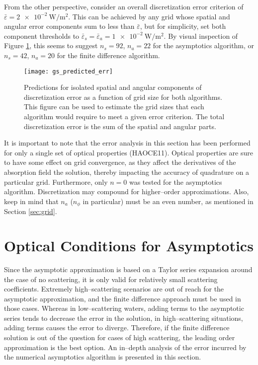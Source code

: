 From the other perspective, consider an overall discretization error criterion of $\bar{\varepsilon}=\SI{2e-2}{\W\per\m\squared}$.
This can be achieved by any grid whose spatial and angular error components sum to less than $\bar{\varepsilon}$, but for simplicity, set both component thresholds to $\bar{\varepsilon}_s=\bar{\varepsilon}_a=\SI{1e-2}{\W\per\m\squared}$.
By visual inspection of Figure \ref{fig:gs_predicted_err}, this seems to suggest $n_s=92$, $n_a=22$ for the asymptotics algorithm, or $n_s=42$, $n_a=20$ for the finite difference algorithm.

\begin{figure}[H]
  \centering
  \texttt{[image: gs\_predicted\_err]}
  \caption{Predictions for isolated spatial and angular components of discretization error as a function of grid size for both algorithms. This figure can be used to estimate the grid sizes that each algorithm would require to meet a given error criterion. The total discretization error is the sum of the spatial and angular parts.}
  \label{fig:gs_predicted_err}
\end{figure}

It is important to note that the error analysis in this section has been performed for only a single set of optical properties (HAOCE11).
Optical properties are sure to have some effect on grid convergence, as they affect the derivatives of the absorption field the solution, thereby impacting the accuracy of quadrature on a particular grid.
Furthermore, only $n=0$ was tested for the asymptotics algorithm.
Discretization may compound for higher--order approximations.
Also, keep in mind that $n_a$ ($n_\phi$ in particular) must be an even number, as mentioned in Section \ref{sec:grid}.

\section{Optical Conditions for Asymptotics}
Since the asymptotic approximation is based on a Taylor series expansion around the case of no scattering, it is only valid for relatively small scattering coefficients.
Extremely high--scattering scenarios are out of reach for the asymptotic approximation, and the finite difference approach must be used in those cases.
Whereas in low--scattering waters, adding terms to the asymptotic series tends to decrease the error in the solution, in high--scattering situations, adding terms causes the error to diverge.
Therefore, if the finite difference solution is out of the question for cases of high scattering, the leading order approximation is the best option.
An in--depth analysis of the error incurred by the numerical asymptotics algorithm is presented in this section.

